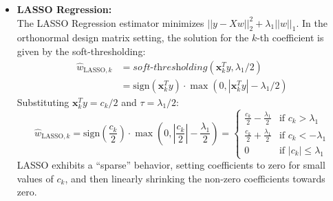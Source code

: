 \documentclass[11pt, a4paper, oneside]{memoir}
\begin{document}
\begin{itemize}
    \item \textbf{LASSO Regression:} \\
          The LASSO Regression estimator minimizes $||y - Xw||_2^2 + \lambda_1 ||w||_1$. In the orthonormal design matrix setting,
          the solution for the $k$-th coefficient is given by the soft-thresholding:
          \begin{align*}
              \hat{w}_{\text{LASSO},k} & = \textit{soft-thresholding}(\mathbf{x}_k^T y, \lambda_1/2)                     \\
                                       & = \text{sign}(\mathbf{x}_k^T y) \cdot \max(0, |\mathbf{x}_k^T y| - \lambda_1/2)
          \end{align*}
          Substituting $\mathbf{x}_k^T y = c_k / 2$ and $\tau = \lambda_1 / 2$:
          \[
              \hat{w}_{\text{LASSO},k} = \text{sign}\left(\frac{c_k}{2}\right) \cdot \max\left(0, \left|\frac{c_k}{2}\right| - \frac{\lambda_1}{2}\right)
              = \begin{cases}
                  \frac{c_k}{2} - \frac{\lambda_1}{2} & \text{if } c_k > \lambda_1     \\
                  \frac{c_k}{2} + \frac{\lambda_1}{2} & \text{if } c_k < -\lambda_1    \\
                  0                                   & \text{if } |c_k| \le \lambda_1
              \end{cases}
          \]
          LASSO exhibits a ``sparse'' behavior, setting coefficients to zero for small values of $c_k$,
          and then linearly shrinking the non-zero coefficients towards zero.
\end{itemize}
\end{document}

